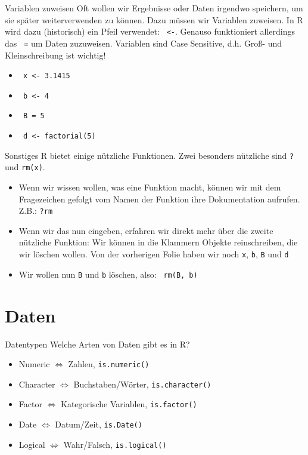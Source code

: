 \documentclass[xcolor=dvipsnames, aspectratio = 169]{beamer}
\begin{document}
\begin{frame}[fragile]{Variablen zuweisen}
Oft wollen wir Ergebnisse oder Daten irgendwo speichern, um sie später weiterverwenden zu können. Dazu müssen wir Variablen zuweisen. In R wird dazu (historisch) ein Pfeil verwendet: \verb+ <-+. Genauso funktioniert allerdings das \verb+ =+ um Daten zuzuweisen. Variablen sind \glqq Case Sensitive\grqq{}, d.h. Groß- und Kleinschreibung ist wichtig!
\begin{itemize}
	\item \verb+ x <- 3.1415+
	\item \verb+ b <- 4+
	\item \verb+ B = 5+
	\item \verb+ d <- factorial(5)+
\end{itemize}
\end{frame}

\begin{frame}[fragile]{Sonstiges}
R bietet einige nützliche Funktionen. Zwei besonders nützliche sind \verb+?+ und \verb+rm(x)+.
\begin{itemize}
	\item Wenn wir wissen wollen, was eine Funktion macht, können wir mit dem Fragezeichen gefolgt vom Namen der Funktion ihre Dokumentation aufrufen. Z.B.: \verb+?rm+
	\item Wenn wir das nun eingeben, erfahren wir direkt mehr über die zweite nützliche Funktion: Wir können in die Klammern Objekte reinschreiben, die wir löschen wollen. Von der vorherigen Folie haben wir noch \verb+x+, \verb+b+, \verb+B+ und \verb+d+
	\item Wir wollen nun \verb+B+ und \verb+b+ löschen, also: \verb+ rm(B, b)+
\end{itemize}
\end{frame}

\section{Daten}
\begin{frame}[fragile]{Datentypen}
	Welche Arten von Daten gibt es in R?
	\begin{itemize}
		\item Numeric $\Leftrightarrow$ Zahlen, \verb+is.numeric()+
		\item Character $\Leftrightarrow$ Buchstaben/Wörter, \verb+is.character()+
		\item Factor $\Leftrightarrow$ Kategorische Variablen, \verb+is.factor()+
		\item Date $\Leftrightarrow$ Datum/Zeit, \verb+is.Date()+
		\item Logical $\Leftrightarrow$ Wahr/Falsch, \verb+is.logical()+
	\end{itemize}
\end{frame}
\end{document}
